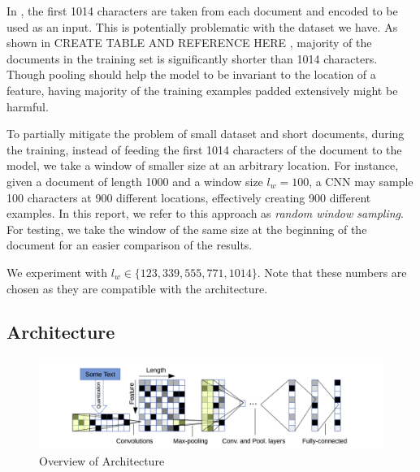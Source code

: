 In \citep{zhang2015character}, the first 1014 characters are taken from each document and encoded to be used as an input.
This is potentially problematic with the dataset we have.
As shown in \color{red} CREATE TABLE AND REFERENCE HERE \color{black}, majority of the documents in the training set is significantly shorter than 1014 characters.
Though pooling should help the model to be invariant to the location of a feature, having majority of the training examples padded extensively might be harmful.

To partially mitigate the problem of small dataset and short documents, during the training, instead of feeding the first 1014 characters of the document to the model, we take a window of smaller size at an arbitrary location.
For instance, given a document of length 1000 and a window size $l_w = 100$, a CNN may sample 100 characters at 900 different locations, effectively creating 900 different examples.
In this report, we refer to this approach as \emph{random window sampling}.
For testing, we take the window of the same size at the beginning of the document for an easier comparison of the results.

We experiment with $l_w \in \{123, 339, 555, 771, 1014\}$.
Note that these numbers are chosen as they are compatible with the architecture.
\subsection{Architecture}
\begin{figure}[h]
\includegraphics[width=\textwidth]{architecture.png}
\caption{Overview of Architecture}
\label{fig:architecture}
\end{figure}

